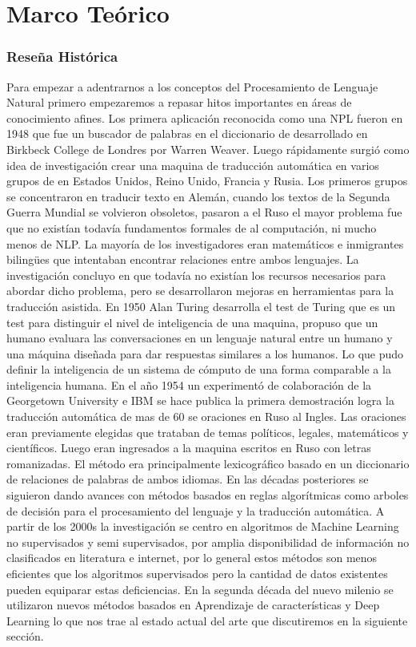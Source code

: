 \chapter[Revisión de literatura]{Marco Teórico}

\subsection[Reseña Histórica]{Reseña Histórica}
Para empezar a adentrarnos a los conceptos del Procesamiento de Lenguaje Natural primero
empezaremos a repasar hitos importantes en áreas de conocimiento afines.
Los primera aplicación reconocida como una NPL fueron en 1948 que fue un buscador de palabras en el
diccionario de desarrollado en Birkbeck College de Londres por Warren Weaver. Luego rápidamente
surgió como idea de investigación crear una maquina de traducción automática en varios grupos de en
Estados Unidos, Reino Unido, Francia y Rusia. Los primeros grupos se concentraron en traducir texto
en Alemán, cuando los textos de la Segunda Guerra Mundial se volvieron obsoletos, pasaron a el Ruso
el mayor problema fue que no existían todavía fundamentos formales de al computación, ni mucho
menos de NLP. La mayoría de los investigadores eran matemáticos e inmigrantes bilingües que
intentaban encontrar relaciones entre ambos lenguajes. La investigación concluyo en que todavía no
existían los recursos necesarios para abordar dicho problema, pero se desarrollaron mejoras en
herramientas para la traducción asistida.\cite{hancox}
En 1950 Alan Turing desarrolla el test de Turing que es un test para distinguir el nivel de
inteligencia de una maquina, propuso que un humano evaluara las conversaciones en un lenguaje
natural entre un humano y una máquina diseñada para dar respuestas similares a los humanos. Lo que
pudo definir la inteligencia de un sistema de cómputo de una forma comparable a la inteligencia
humana.
En el año 1954 un experimentó de colaboración de la Georgetown University e IBM se  hace publica la
primera demostración logra la traducción automática de mas de 60 se oraciones en Ruso al Ingles.
Las oraciones eran previamente elegidas que trataban de temas políticos, legales, matemáticos y
científicos. Luego eran ingresados a la maquina escritos en Ruso con letras romanizadas. El método
era principalmente lexicográfico basado en un diccionario de relaciones de palabras de ambos
idiomas.\cite{ibm_2003}
En las décadas posteriores se siguieron dando avances con métodos basados en reglas algorítmicas
como arboles de decisión para el procesamiento del lenguaje y la traducción automática. A partir de
los 2000s la investigación se centro en algoritmos de Machine Learning no supervisados y semi
supervisados, por amplia disponibilidad de información no clasificados en literatura e internet,
por lo general estos métodos son menos eficientes que los algoritmos supervisados pero la cantidad
de datos existentes pueden equiparar estas deficiencias. En la segunda década del nuevo milenio se
utilizaron nuevos métodos basados en Aprendizaje de características y Deep Learning lo que nos trae
al estado actual del arte que discutiremos en la siguiente sección.

